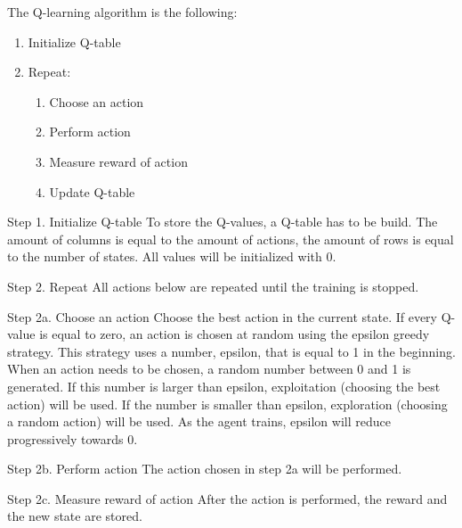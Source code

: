\documentclass{article}
\begin{document}
\begin{flushleft}
The Q-learning algorithm is the following:
\begin{enumerate}
\item Initialize Q-table
\item Repeat:
\begin{enumerate}
\item Choose an action
\item Perform action
\item Measure reward of action
\item Update Q-table
\end{enumerate}
\end{enumerate}
\end{flushleft}

\begin{flushleft}
Step 1. Initialize Q-table
To store the Q-values, a Q-table has to be build. The amount of columns is equal to the amount of actions, the amount of rows is equal to the number of states. All values will be initialized with 0.
\end{flushleft}

\begin{flushleft}
Step 2. Repeat
All actions below are repeated until the training is stopped.
\end{flushleft}

\begin{flushleft}
Step 2a. Choose an action
Choose the best action in the current state. If every Q-value is equal to zero, an action is chosen at random using the epsilon greedy strategy. This strategy uses a number, epsilon, that is equal to 1 in the beginning. When an action needs to be chosen, a random number between 0 and 1 is generated. If this number is larger than epsilon, exploitation (choosing the best action) will be used. If the number is smaller than epsilon, exploration (choosing a random action) will be used. As the agent trains, epsilon will reduce progressively towards 0.
\end{flushleft}

\begin{flushleft}
Step 2b. Perform action
The action chosen in step 2a will be performed.
\end{flushleft}

\begin{flushleft}
Step 2c. Measure reward of action
After the action is performed, the reward and the new state are stored. 
\end{flushleft}
\end{document}
